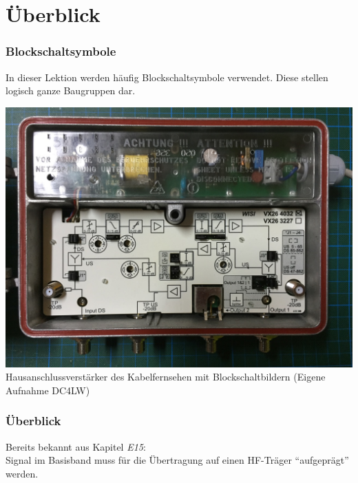 

\subtitle{Technik Klasse A 13: \\
Frequenzaufbereitung \\[2em]}
\date{Stand 17.06.2016}



\section{Überblick}

\begin{frame}
  \frametitle{Blockschaltsymbole}
  In dieser Lektion werden häufig Blockschaltsymbole verwendet. Diese stellen logisch ganze Baugruppen dar.

  \begin{center}
    \includegraphics[width=\textwidth,height=.65\textheight,keepaspectratio]{a13/IMG_4686.jpg}\\
    {\small Hausanschlussverstärker des Kabelfernsehen mit Blockschaltbildern} {\tiny (Eigene Aufnahme DC4LW)}
  \end{center}
\end{frame}

\begin{frame}
  \frametitle{Überblick}

  Bereits bekannt aus Kapitel \emph{E15}: \\[2em]

  Signal im Basisband muss für die Übertragung auf einen HF-Träger
  ``aufgeprägt'' werden.
\end{frame}


